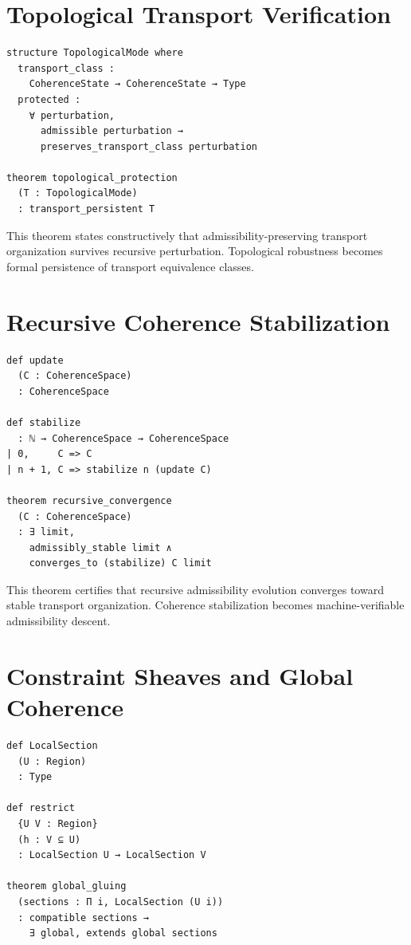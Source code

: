 \documentclass[11pt,openany]{book}
\theoremstyle{definition}
\theoremstyle{plain}
\begin{document}
\section{Topological Transport Verification}

\begin{verbatim}
structure TopologicalMode where
  transport_class :
    CoherenceState → CoherenceState → Type
  protected :
    ∀ perturbation,
      admissible perturbation →
      preserves_transport_class perturbation

theorem topological_protection
  (T : TopologicalMode)
  : transport_persistent T
\end{verbatim}

This theorem states constructively that admissibility-preserving transport organization survives recursive perturbation. Topological robustness becomes formal persistence of transport equivalence classes.

\section{Recursive Coherence Stabilization}

\begin{verbatim}
def update
  (C : CoherenceSpace)
  : CoherenceSpace

def stabilize
  : ℕ → CoherenceSpace → CoherenceSpace
| 0,     C => C
| n + 1, C => stabilize n (update C)

theorem recursive_convergence
  (C : CoherenceSpace)
  : ∃ limit,
    admissibly_stable limit ∧
    converges_to (stabilize) C limit
\end{verbatim}

This theorem certifies that recursive admissibility evolution converges toward stable transport organization. Coherence stabilization becomes machine-verifiable admissibility descent.

\section{Constraint Sheaves and Global Coherence}

\begin{verbatim}
def LocalSection
  (U : Region)
  : Type

def restrict
  {U V : Region}
  (h : V ⊆ U)
  : LocalSection U → LocalSection V

theorem global_gluing
  (sections : Π i, LocalSection (U i))
  : compatible sections →
    ∃ global, extends global sections
\end{verbatim}
\end{document}
